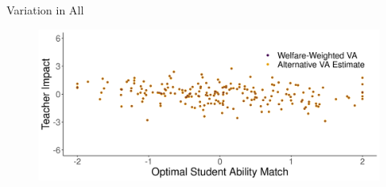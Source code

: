 \documentclass[11pt]{beamer}
\begin{document}

\section*{}
\begin{frame}[noframenumbering]{Variation in All}

\hypertarget{np_cent4}{}
\vfill

\begin{figure}
    \centering
 \includegraphics[width=.75\textwidth]{slides/Figures/np_welfare_cent_run_4.png}
\end{figure}

\hyperlink{all2}{}

\end{frame}
\end{document}
